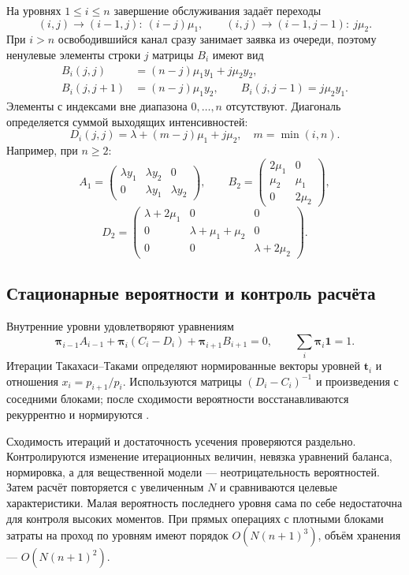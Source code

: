 На уровнях \(1\le i\le n\) завершение обслуживания задаёт переходы
\[
(i,j)\to(i-1,j):\ (i-j)\mu_1,\qquad
(i,j)\to(i-1,j-1):\ j\mu_2.
\]
При \(i>n\) освободившийся канал сразу занимает заявка из очереди, поэтому ненулевые элементы строки \(j\) матрицы \(B_i\) имеют вид
\begin{align*}
B_i(j,j)&=(n-j)\mu_1y_1+j\mu_2y_2,\\
B_i(j,j+1)&=(n-j)\mu_1y_2,\qquad
B_i(j,j-1)=j\mu_2y_1.
\end{align*}
Элементы с индексами вне диапазона \(0,\ldots,n\) отсутствуют. Диагональ определяется суммой выходящих интенсивностей:
\[
D_i(j,j)=\lambda+(m-j)\mu_1+j\mu_2,\quad m=\min(i,n).
\]
Например, при \(n\ge2\):
\[
A_1=\begin{pmatrix}\lambda y_1&\lambda y_2&0\\0&\lambda y_1&\lambda y_2\end{pmatrix},\qquad
B_2=\begin{pmatrix}2\mu_1&0\\\mu_2&\mu_1\\0&2\mu_2\end{pmatrix},
\]
\[
D_2=\begin{pmatrix}\lambda+2\mu_1&0&0\\0&\lambda+\mu_1+\mu_2&0\\0&0&\lambda+2\mu_2\end{pmatrix}.
\]

\subsection{Стационарные вероятности и контроль расчёта}
Внутренние уровни удовлетворяют уравнениям
\[
\boldsymbol\pi_{i-1}A_{i-1}+\boldsymbol\pi_i(C_i-D_i)+\boldsymbol\pi_{i+1}B_{i+1}=0,
\qquad \sum_i\boldsymbol\pi_i\mathbf1=1.
\]
Итерации Такахаси--Таками определяют нормированные векторы уровней \(\boldsymbol t_i\) и отношения \(x_i=p_{i+1}/p_i\). Используются матрицы \((D_i-C_i)^{-1}\) и произведения с соседними блоками; после сходимости вероятности восстанавливаются рекуррентно и нормируются \cite{takahashi1976,ryzhikov2018ru}.

Сходимость итераций и достаточность усечения проверяются раздельно. Контролируются изменение итерационных величин, невязка уравнений баланса, нормировка, а для вещественной модели --- неотрицательность вероятностей. Затем расчёт повторяется с увеличенным \(N\) и сравниваются целевые характеристики. Малая вероятность последнего уровня сама по себе недостаточна для контроля высоких моментов. При прямых операциях с плотными блоками затраты на проход по уровням имеют порядок \(O(N(n+1)^3)\), объём хранения --- \(O(N(n+1)^2)\).

